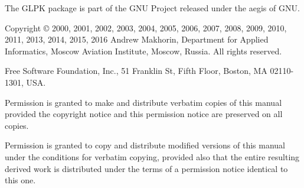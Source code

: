\documentclass[11pt]{report}
\begin{document}
\thispagestyle{empty}


\newpage

\vspace*{1in}

\vfill

\noindent
The GLPK package is part of the GNU Project released under the aegis of
GNU.

\noindent
Copyright \copyright{} 2000, 2001, 2002, 2003, 2004, 2005, 2006, 2007,
2008, 2009, 2010, 2011, 2013, 2014, 2015, 2016 Andrew Makhorin,
Department for Applied Informatics, Moscow Aviation Institute, Moscow,
Russia. All rights reserved.

\noindent
Free Software Foundation, Inc., 51 Franklin St, Fifth Floor, Boston, MA
02110-1301, USA.

\noindent
Permission is granted to make and distribute verbatim copies of this
manual provided the copyright notice and this permission notice are
preserved on all copies.

\noindent
Permission is granted to copy and distribute modified versions of this
manual under the conditions for verbatim copying, provided also that
the entire resulting derived work is distributed under the terms of
a permission notice identical to this one.
\end{document}

